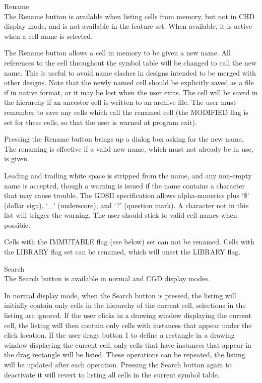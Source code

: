 \begin{description}
\item{\cb Rename}\\
The {\cb Rename} button is available when listing cells from memory,
but not in CHD display mode, and is not available in the {\Xiv}
feature set.  When available, it is active when a cell name is
selected.

The {\cb Rename} button allows a cell in memory to be given a new
name.  All references to the cell throughout the symbol table will be
changed to call the new name.  This is useful to avoid name clashes in
designs intended to be merged with other designs.  Note that the newly
named cell should be explicitly saved as a file if in native format,
or it may be lost when the user exits.  The cell will be saved in the
hierarchy if an ancestor cell is written to an archive file.  The user
must remember to save any cells which call the renamed cell (the
MODIFIED flag is set for these cells, so that the user is warned at
program exit).

Pressing the {\cb Rename} button brings up a dialog box asking for the
new name.  The renaming is effective if a valid new name, which must
not already be in use, is given.

Leading and trailing white space is stripped from the name, and any
non-empty name is accepted, though a warning is issued if the name
contains a character that may cause trouble.  The GDSII specification
allows alpha-numerics plus `{\vt \$}' (dollar sign), `{\vt \_}'
(underscore), and `{\vt ?}' (question mark).  A character not in this
list will trigger the warning.  The user should stick to valid cell
names when possible.

Cells with the IMMUTABLE flag (see below) set can not be renamed. 
Cells with the LIBRARY flag set can be renamed, which will unset the
LIBRARY flag.

\item{\cb Search}\\
The {\cb Search} button is available in normal and CGD display modes.

In normal display mode, when the {\cb Search} button is pressed, the
listing will initially contain only cells in the hierarchy of the
current cell, selections in the listing are ignored.  If the user
clicks in a drawing window displaying the current cell, the listing
will then contain only cells with instances that appear under the
click location.  If the user drags button 1 to define a rectangle in a
drawing window displaying the current cell, only cells that have
instances that appear in the drag rectangle will be listed.  These
operations can be repeated, the listing will be updated after each
operation.  Pressing the {\cb Search} button again to deactivate it
will revert to listing all cells in the current symbol table.


\end{description}

